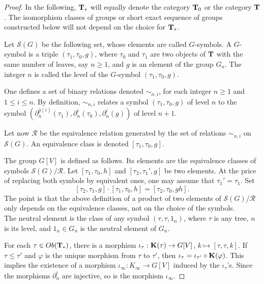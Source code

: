 \documentclass[twoside]{irmaems}
\theoremstyle{plain}
\theoremstyle{definition}
\theoremstyle{remark}
\begin{document}
\begin{proof}
In the following, ${\bf T}_{*}$ will equally denote the category ${\bf T}_{0}$ or the category ${\bf T}$ . The isomorphism
classes of groups or short exact sequence of groups constructed below will not depend on the choice for ${\bf T}_{*}$.


\vspace{0.1cm}\noindent 
Let $\mathscr{S}(G)$ be the following set, whose elements are called $G$-symbols. A $G$-symbol
is a triple $(\tau_{1},\tau_{0}, g)$, where $\tau_{0}$ and $\tau_{1}$ are two objects of 
$\bf T$ with the same number of leaves, say $n\geq 1$, and $g$ is an element of the group $G_{n}$.
The integer $n$ is called the level of the $G$-symbol  $(\tau_{1},\tau_{0}, g)$.

\vspace{0.1cm}\noindent 
One defines a set of binary relations denoted $\sim_{n,i}$, for each integer $n\geq 1$ and $1\leq i\leq n$. By definition,
 $\sim_{n,i}$ relates a symbol $(\tau_{1},\tau_{0}, g)$ of level $n$ to the symbol 
 $(\partial^{\bar{g}(i)}_{n}(\tau_{1}),\partial^{i}_{n}(\tau_{0}), \partial^{i}_{n}(g))$ of level $n+1$.

\vspace{0.1cm}\noindent 
 Let now $\mathscr{R}$ be the equivalence relation generated by the set of relations $\sim_{n,i}$ on  $\mathscr{S}(G)$.
 An equivalence class is denoted $[\tau_{1},\tau_{0}, g]$.
 
\vspace{0.1cm}\noindent 
 The group $G[V]$ is defined as follows. Its elements are the equivalence classes of symbols
 $\mathscr{S}(G)/\mathscr{R}$. Let $[\tau_{1},\tau_{0},h]$ and $[\tau_{2},\tau_{1}',g]$
 be two elements. At the price of replacing both symbols by equivalent ones, one may assume that
 $\tau_{1}'=\tau_{1}$. Set $$[\tau_{2},\tau_{1},g]\cdot [\tau_{1},\tau_{0},h]=[\tau_{2},\tau_{0}, gh].$$
 The point is that the above  definition of a product of two elements of  $\mathscr{S}(G)/\mathscr{R}$
 only depends on the equivalence classes, not on  the choice of the symbols.\\
 The neutral element is the class of any symbol $(\tau,\tau, 1_{n})$, where $\tau$ is any tree, $n$ is its level, and $1_{n}\in G_{n}$ is
 the neutral element of $G_{n}$.

\vspace{0.1cm}\noindent  
 For each  $\tau\in Ob({\bf T}_{*})$, there is a morphism $\iota_{\tau}:{\bf K}(\tau)\rightarrow G[V]$, $k\mapsto [\tau,\tau, k]$. If
 $\tau\leq \tau'$ and $\varphi$ is the unique morphism from $\tau$ to $\tau'$, then $\iota_{\tau}=\iota_{\tau'}\circ {\bf K}(\varphi)$. This implies
 the existence of a morphism $\iota_{\infty}:K_{\infty}\rightarrow G[V]$ induced by the $\iota_{\tau}$'s. Since the morphisms 
 $\partial^{i}_{n}$ are injective, so is the morphism $\iota_{\infty}$.


\end{proof}
\end{document}
